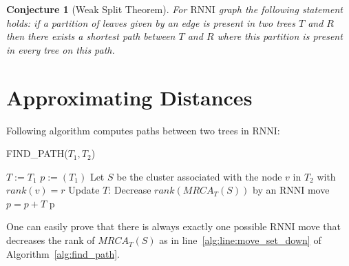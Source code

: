 \documentclass[11pt, a4paper]{article}
\newcommand{\rnni}{\mathrm{RNNI}}
\newtheorem{conjecture}[definition]{Conjecture}
\begin{document}
\begin{conjecture}[Weak Split Theorem]
	For $\rnni$ graph the following statement holds:
	if a partition of leaves given by an edge is present in two trees $T$ and $R$ then there exists a shortest path between $T$ and $R$ where this partition is present in every tree on this path.
	\label{split_theorem_weak}
\end{conjecture}



%


\section{Approximating Distances}

Following algorithm computes paths between two trees in $\rnni$:

\begin{algorithm}[H]
\caption{FIND\_PATH($T_1,T_2$)}
\label{alg:find_path}
\begin{algorithmic}[1]
	\STATE $T := T_1$
	\STATE $p := (T_1)$
		\STATE Let $S$ be the cluster associated with the node $v$ in $T_2$ with $rank(v) = r$
			\STATE Update $T$: Decrease $rank(MRCA_T(S))$ by an $\rnni$ move \label{alg:line:move_set_down}
			\STATE $p = p+T$
		\ENDWHILE
	\ENDFOR
	\RETURN p
\end{algorithmic}
\end{algorithm}

One can easily prove that there is always exactly one possible $\rnni$ move that decreases the rank of $MRCA_T(S)$ as in line~\ref{alg:line:move_set_down} of Algorithm~\ref{alg:find_path}.
\end{document}
